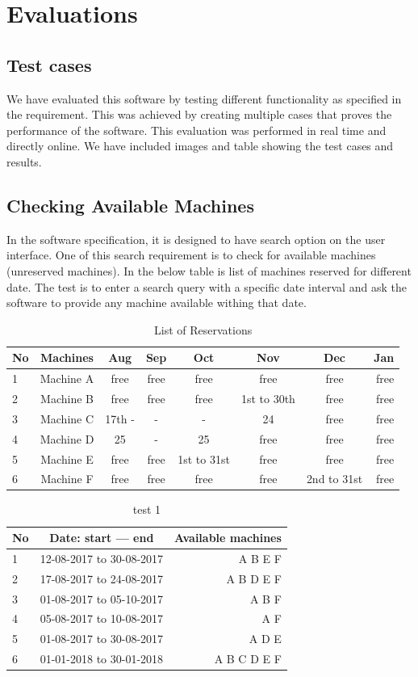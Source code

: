 \chapter{Evaluations} 
\label{chap:refs}
\label{chap:ch5_abbr}
\section{Test cases}
We have evaluated this software by testing different functionality as specified in the requirement. This was achieved by creating multiple cases that proves the performance of the software. This evaluation was performed in real time and directly online. We have included images and table showing the test cases and results. 
\section*{Checking Available Machines}
In the software specification, it is designed to have search option on the user interface. One of this search requirement is to check for available machines (unreserved machines). In the below table is list of machines reserved for different date. The test is to enter a search query with a specific date interval and ask the software to provide any machine available withing that date.

\begin{table}[h!]
  \centering
  \label{tab:table1}
  \begin{tabular}{l|c||c||c||c||c||c||r}
    No & Machines & Aug & Sep & Oct & Nov & Dec & Jan \\
    \hline
    1 &Machine A & free & free & free & free & free & free\\
    2 &Machine B & free & free & free & 1st to 30th & free & free\\
    3 &Machine C & 17th - & - & - & 24 & free & free\\
    4 &Machine D & 25 & - & 25 & free & free & free\\
    5 &Machine E & free & free & 1st to 31st & free & free & free\\
    6 &Machine F & free & free & free & free & 2nd to 31st & free\\
  \end{tabular}
  \caption{List of Reservations}
\end{table}

\begin{table}[h!]
  \centering
  \label{tab:table1}
  \begin{tabular}{l|c||r}
    No & Date: start --- end & Available machines\\
    \hline
    1 &12-08-2017 to 30-08-2017  & A B E F \\
    2 &17-08-2017 to 24-08-2017  & A B D E F\\
    3 &01-08-2017 to 05-10-2017  & A B F \\
    4 &05-08-2017 to 10-08-2017  & A F \\
    5 &01-08-2017 to 30-08-2017  & A D E  \\
    6 &01-01-2018 to 30-01-2018  & A B C D E F \\
  \end{tabular}
  \caption{test 1}
\end{table}

